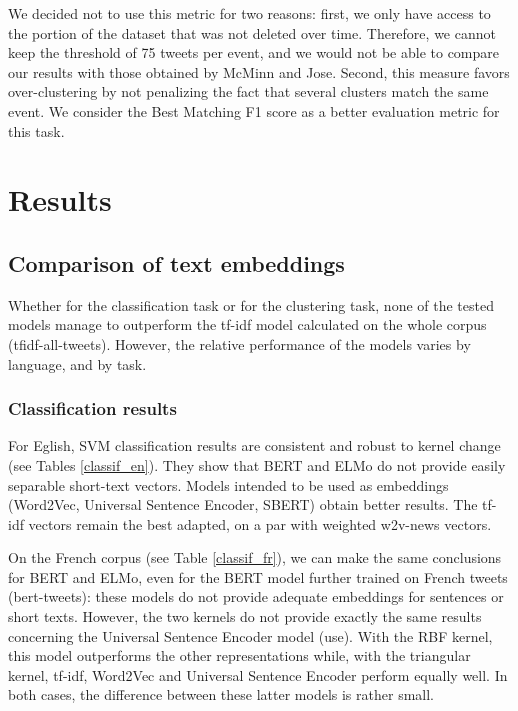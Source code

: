 We decided not to use this metric for two reasons: first, we only have access to the portion of the \citet{mcminn_building_2013} dataset that was not deleted over time. Therefore, we cannot keep the threshold of 75 tweets per event, and we would not be able to compare our results with those obtained by McMinn and Jose. Second, this measure favors over-clustering by not penalizing the fact that several clusters match the same event. We consider the Best Matching F1 score as a better evaluation metric for this task.


\section{Results}
\label{Sec: results}

\subsection{Comparison of text embeddings}
\label{Subsec: text embeddings}
Whether for the classification task or for the clustering task, none of the tested models manage to outperform the tf-idf model calculated on the whole corpus (tfidf-all-tweets). However, the relative performance of the models varies by language, and by task.

\subsubsection{Classification results}

For Eglish, SVM classification results are consistent and robust to kernel change (see Tables \ref{classif_en}). They show that BERT and ELMo do not provide easily separable short-text vectors. Models intended to be used as embeddings (Word2Vec, Universal Sentence Encoder, SBERT) obtain better results. The tf-idf vectors remain the best adapted,  on a par with weighted w2v-news vectors. 

On the French corpus (see Table \ref{classif_fr}), we can make the same conclusions for BERT and ELMo, even for the BERT model further trained on French tweets (bert-tweets): these models do not provide adequate embeddings for sentences or short texts. However, the two kernels do not provide exactly the same results concerning the Universal Sentence Encoder model (use). With the RBF kernel, this model outperforms the other representations
while, with the triangular kernel, tf-idf, Word2Vec and Universal Sentence Encoder perform equally well. In both cases, the difference between these latter models is rather small.

